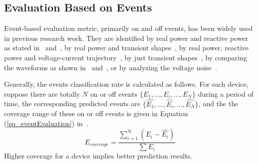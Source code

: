 \subsection{Evaluation Based on Events}
Event-based evaluation metric, primarily on and off events, has been widely used in 
previous research work. 
They are identified by real power and reactive power as stated in~\cite{berges2009learning} and~\cite{chang2010newmethod},
by real power and transient shapes~\cite{froehlich2011disaggregated},
by real power, reactive power and voltage-current trajectory~\cite{yang2007design},
by just transient shapes~\cite{chang2008load},
by comparing the waveforms as shown in~\cite{suzuki2008nonintrusive} and~\cite{berges2010enhancing},
or by analyzing the voltage noise~\cite{patel2007flick}.

Generally, the events classification rate is
calculated as follows.
For each device,
suppose there are totally $N$ on or off events 
$\{E_1, ..., E_i, ..., E_N\}$ during
a period of time,
the corresponding predicted events are
$\{\hat{E_1}, ..., \hat{E_i},...,\hat{E_N}\}$,
and the the coverage range of these on or off events is
given in Equation (\ref{eq_eventEvaluation}) in~\cite{nakano2007non}.
\begin{equation}
\label{eq_eventEvaluation}
E_{coverage} = \frac{\sum_{i=1}^N (E_i - \hat{E_i})}{\sum E_i}
\end{equation}
Higher coverage for a device implies better prediction results.




